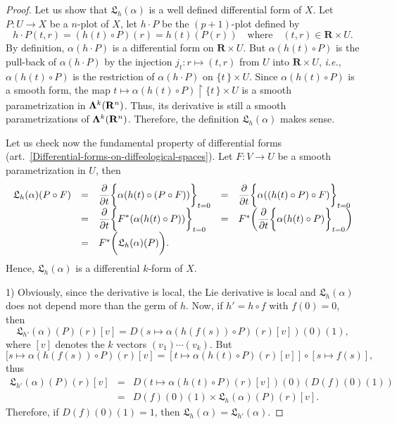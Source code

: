 \documentclass[11pt,reqno]{amsart}
\theoremstyle{definition}
\renewcommand{\over}{\above .2pt}
\newcommand{\qmbox}[1]{\quad \mbox{#1}\quad}
\newcommand{\RR}{{\mathbf R}}
\def \D{{D}}
\def \F{{F}}
\def \P{{P}}
\def \U{{U}}
\def \V{{V}}
\def \X{{X}}
\newcommand{\fL}{{\mathfrak  L}}
\newcommand{\art}[1]{{(art.~\ref{#1})}}
\newcommand{\Forms}{{\bf \Lambda}}
\newcommand{\DLie}{{\fL}}
\begin{document}
  \begin{proof}
    Let us show that $\DLie_h(\alpha)$ is a well defined
    differential form of $\X$. Let $\P: \U \to \X$ be a
    $n$-plot of $\X$, let $h\cdot \P$ be the $(p+1)$-plot
    defined by
    $$
      h\cdot \P(t,r) =  (h(t) \circ \P)(r) = h(t)(\P(r))
      \qmbox{where} (t,r) \in \RR\times \U.
      $$
    By definition,
    $\alpha(h\cdot \P)$ is a differential form on
    $\RR\times \U$. But $\alpha(h(t) \circ \P)$ is the pull-back of
    $\alpha(h\cdot \P)$ by the injection $j_t: r \mapsto
      (t,r)$ from $\U$ into $\RR \times \U$, {\em i.e.},
    $\alpha(h(t) \circ \P)$ is the restriction of
    $\alpha(h\cdot \P)$ on $\{t\,\} \times \U$. Since
    $\alpha(h(t) \circ \P)$ is a smooth form, the map
    $t \mapsto \alpha(h(t) \circ \P)\restriction \{t\,\}
      \times \U$ is a smooth parametrization in
    $\Forms^k(\RR^n)$. Thus, its derivative is still a smooth
    parametrizations of $\Forms^k(\RR^n)$. Therefore, the
    definition $\DLie_h(\alpha)$ makes sense. 
    
    Let us check now the fundamental property of
    differential forms
    \art{Differential-forms-on-diffeological-spaces}. Let
    $\F: \V \to \U$ be a smooth parametrization in
    $\U$, then
    \def\arraystretch{2.5}
    $$
      \begin{array}{lllll}
      \DLie_h(\alpha)(\P \circ \F) & = &
      \displaystyle{\partial \over \partial
      t}\bigg\{\alpha(h(t) \circ (\P \circ
      \F))\bigg\}_{t = 0}  & = &
      \displaystyle{\partial \over\partial
      t}\bigg\{\alpha((h(t) \circ \P) \circ
      \F)\bigg\}_{t = 0} \\
      & = & \displaystyle{\partial \over \partial
      t}\bigg\{\F^*(\alpha(h(t) \circ
      \P))\bigg\}_{t = 0}  & = &
      \F^*\bigg(\displaystyle{\partial
      \over\partial t}\bigg\{\alpha(h(t) \circ
      \P)\bigg\}_{t = 0}\bigg) \\
      & = &
      \F^*\bigg(\DLie_h(\alpha)(\P)\bigg). & &
      \end{array}
      $$
    Hence, $\DLie_h(\alpha)$ is a differential
    $k$-form of $\X$. 
    
    1) Obviously, since the derivative is local, the
    Lie derivative is local and $\DLie_h(\alpha)$ does not
    depend more than the germ of $h$. Now,
    if $h' = h \circ f$ with $f(0) = 0$, then
    $$
    \DLie_{h'}(\alpha)(\P)(r)[v] = \D(s \mapsto \alpha(h(f(s)) \circ \P)(r)[v])(0)(1),
    $$
    where $[v]$ denotes the $k$ vectors $(v_1)\cdots(v_k)$. But 
    $$
    [s \mapsto \alpha(h(f(s)) \circ \P)(r)[v]
    = [t \mapsto \alpha(h(t) \circ \P)(r)[v]] \circ [s \mapsto f(s)],
    $$
    thus 
    \begin{eqnarray*}
    \DLie_{h'}(\alpha)(\P)(r)[v] & = & \D(t \mapsto \alpha(h(t) \circ \P)(r)[v])(0)(\D(f)(0)(1)) \\
    & = & \D(f)(0)(1) \times \DLie_h(\alpha)(\P)(r)[v].
    \end{eqnarray*}
    Therefore, if $\D(f)(0)(1) = 1$, then $\DLie_h(\alpha) = \DLie_{h'}(\alpha)$.
    

\end{proof}
\end{document}

